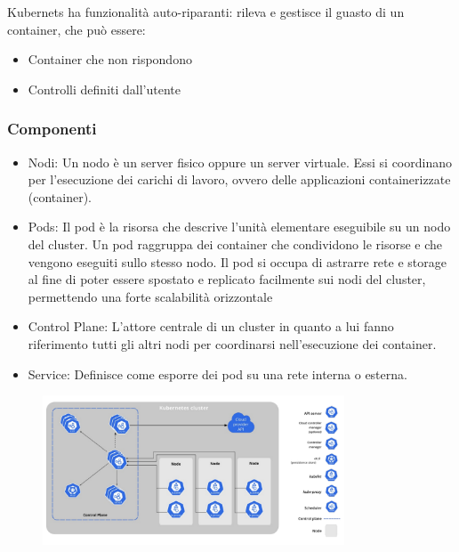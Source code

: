 \documentclass{article}
\begin{document}
		Kubernets ha funzionalità auto-riparanti: rileva e gestisce il guasto di un container, che può essere:
		\begin{itemize}
		    \item Container che non rispondono
		    \item Controlli definiti dall'utente
		\end{itemize}
		
		\subsubsection{Componenti}
		\begin{itemize}
		    \item Nodi:  Un nodo è un server fisico oppure un server virtuale. Essi si coordinano per l'esecuzione dei carichi di lavoro, ovvero delle applicazioni containerizzate (container).
		    \item Pods: Il pod è la risorsa che descrive l'unità elementare eseguibile su un nodo del cluster. Un pod raggruppa dei container che condividono le risorse e che vengono eseguiti sullo stesso nodo. Il pod si occupa di astrarre rete e storage al fine di poter essere spostato e replicato facilmente sui nodi del cluster, permettendo una forte scalabilità orizzontale
		    \item Control Plane: L'attore centrale di un cluster in quanto a lui fanno riferimento tutti gli altri nodi per coordinarsi nell'esecuzione dei container.
		    \item Service: Definisce come esporre dei pod su una rete interna o esterna.
		\end{itemize}
		\begin{figure}[ht]
		    \centering
		    \includegraphics[width=0.8\textwidth]{SAC_B2_KubernetesComponents.png}
		\end{figure}
		
\end{document}
